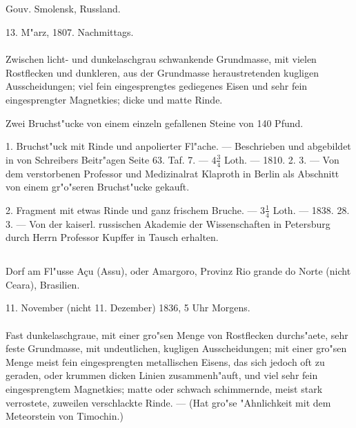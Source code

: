 \documentclass[a4paper, 11pt, oneside, polutonikogreek, german]{article}
\begin{document}
\subsection{}
\begin{center}

Gouv. Smolensk, Russland.

13. M"arz, 1807. Nachmittags.
\end{center}
\paragraph{}
Zwischen licht- und dunkelaschgrau schwankende Grundmasse, mit vielen Rostflecken und dunkleren, aus der Grundmasse heraustretenden kugligen Ausscheidungen; viel fein eingesprengtes gediegenes Eisen und sehr fein eingesprengter Magnetkies; dicke und matte Rinde.

Zwei Bruchst"ucke von einem einzeln gefallenen Steine von 140 Pfund.

1. Bruchst"uck mit Rinde und anpolierter Fl"ache. --- Beschrieben und abgebildet in von Schreibers Beitr"agen Seite 63. Taf. 7. --- $4\frac{3}{4}$ Loth. --- 1810. 2. 3. --- Von dem verstorbenen Professor und Medizinalrat Klaproth in Berlin als Abschnitt von einem gr"o"seren Bruchst"ucke gekauft.

2. Fragment mit etwas Rinde und ganz frischem Bruche. --- $3\frac{1}{4}$ Loth. --- 1838. 28. 3. --- Von der kaiserl. russischen Akademie der Wissenschaften in Petersburg durch Herrn Professor Kupffer in Tausch erhalten.
\subsection[\frakfamily{Macao.}]{}
\begin{center}

Dorf am Fl"usse Açu (Assu), oder Amargoro, Provinz Rio grande do Norte (nicht Ceara), Brasilien.

11. November (nicht 11. Dezember) 1836, 5 Uhr Morgens.
\end{center}
\paragraph{}
Fast dunkelaschgraue, mit einer gro"sen Menge von Rostflecken durchs"aete, sehr feste Grundmasse, mit undeutlichen, kugligen Ausscheidungen; mit einer gro"sen Menge meist fein eingesprengten metallischen Eisens, das sich jedoch oft zu geraden, oder krummen dicken Linien zusammenh"auft, und viel sehr fein eingesprengtem Magnetkies; matte oder schwach schimmernde, meist stark verrostete, zuweilen verschlackte Rinde. --- (Hat gro"se "Ahnlichkeit mit dem Meteorstein von Timochin.)
\end{document}
